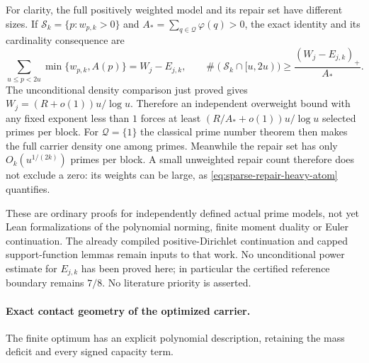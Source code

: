 \documentclass[11pt]{article}
\theoremstyle{definition}
\begin{document}
For clarity, the full positively weighted model and its
repair set have different sizes. If
$\mathcal S_k=\{p:w_{p,k}>0\}$ and
$A_*=\sum_{q\in\mathcal Q}\varphi(q)>0$, the exact identity
and its cardinality consequence are
\begin{equation}
 \sum_{u\le p<2u}\min\{w_{p,k},A(p)\}=W_j-E_{j,k},
 \qquad
 \#(\mathcal S_k\cap[u,2u))
          \ge\frac{(W_j-E_{j,k})_+}{A_*}.
 \label{eq:full-carrier-versus-sparse-repair}
\end{equation}
The unconditional density comparison just proved gives
$W_j=(R+o(1))u/\log u$. Therefore an independent overweight
bound with any fixed exponent less than $1$ forces at least
$(R/A_*+o(1))u/\log u$ selected primes per block.
For $\mathcal Q=\{1\}$ the classical prime number theorem
then makes the full carrier density one among primes.
Meanwhile the repair set has only $O_k(u^{1/(2k)})$ primes
per block. A small unweighted repair count therefore does
not exclude a zero: its weights can be large, as
\eqref{eq:sparse-repair-heavy-atom} quantifies.

These are ordinary proofs for independently defined actual
prime models, not yet Lean formalizations of the polynomial
norming, finite moment duality or Euler continuation.
The already compiled positive-Dirichlet continuation and
capped support-function lemmas remain inputs to that work.
No unconditional power estimate for $E_{j,k}$ has been
proved here; in particular the certified reference boundary
remains $7/8$. No literature priority is asserted.


\paragraph{Exact contact geometry of the optimized carrier.}
The finite optimum has an explicit polynomial description,
retaining the mass deficit and every signed capacity term.
\end{document}
